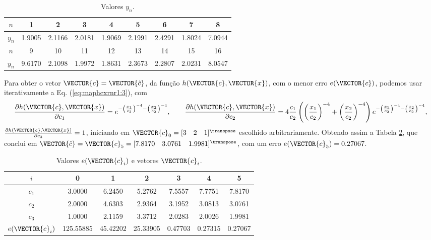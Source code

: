 \begin{table}[h!]
\centering
\begin{tabular}{|c|c|c|c|c|c|c|c|c|} 
 \hline
$n$   & 1 & 2 & 3 & 4 & 5 & 6 & 7 & 8\\ \hline
$y_n$ & 1.9005 & 2.1166 & 2.0181 & 1.9069 & 2.1991 & 2.4291 & 1.8024 & 7.0944  \\ \hline
 \hline
$n$   & 9 & 10 & 11 & 12 & 13 & 14 & 15 & 16\\  \hline
$y_n$ & 9.6170 & 2.1098 & 1.9972 & 1.8631 & 2.3673 & 2.2807 & 2.0231 & 8.0547 \\ \hline
\end{tabular}
\caption{Valores $y_n$.}
\label{table:theo:maphcxrnr1:zn}
\end{table}

\begin{SolutionT}\label{sol:theo:maphcxrnr1}
Para obter  o vetor $\VECTOR{c}=\VECTOR{\hat{c}}$, da função $h(\VECTOR{c},\VECTOR{x})$,
com o menor erro $e(\VECTOR{c})$,
podemos usar iterativamente a Eq. (\ref{eq:maphcxrnr1:3}), com 
\begin{equation}
\frac{\partial h(\VECTOR{c},\VECTOR{x})}{\partial c_1} 
= e^{-\left(\frac{x_1}{c_2}\right)^{-4}-\left(\frac{x_2}{c_2}\right)^{-4}},\qquad 
\frac{\partial h(\VECTOR{c},\VECTOR{x})}{\partial c_2} 
= 4\frac{c_1}{c_2}\left(\left(\frac{x_1}{c_2}\right)^{-4}+\left(\frac{x_2}{c_2}\right)^{-4}\right)e^{-\left(\frac{x_1}{c_2}\right)^{-4}-\left(\frac{x_2}{c_2}\right)^{-4}}, 
\end{equation} 
$\frac{\partial h(\VECTOR{c},\VECTOR{x})}{\partial c_3} =1$,
iniciando em $\VECTOR{c}_{0}=[3\quad 2\quad 1]^{\transpose}$ escolhido arbitrariamente.
Obtendo assim a Tabela \ref{table:theo:maphcxrnr1:ei}, que conclui em
$\VECTOR{\hat{c}}=\VECTOR{c}_{5}=[7.8170\quad 3.0761\quad 1.9981]^{\transpose}$,
com  um erro $e(\VECTOR{c}_{5})=0.27067$.


\begin{table}[h!]
\centering
\begin{tabular}{|c|c|c|c|c|c|c|} 
 \hline
$i$   & 0 & 1 & 2 & 3 & 4 & 5 \\ \hline
\hline
$c_1$ & 3.0000 & 6.2450 & 5.2762 & 7.5557 & 7.7751 & 7.8170 \\ \hline
$c_2$ & 2.0000 & 4.6303 & 2.9364 & 3.1952 & 3.0813 & 3.0761 \\ \hline
$c_3$ & 1.0000 & 2.1159 & 3.3712 & 2.0283 & 2.0026 & 1.9981 \\ \hline
\hline
$e(\VECTOR{c}_{i})$ & 125.55885 & 45.42202 & 25.33905 & 0.47703 & 0.27315 & 0.27067  \\ \hline
\end{tabular}
\caption{Valores $e(\VECTOR{c}_{i})$ e vetores $\VECTOR{c}_{i}$.}
\label{table:theo:maphcxrnr1:ei}
\end{table}


\end{SolutionT}
